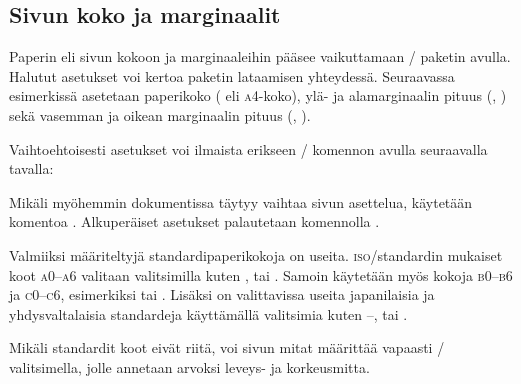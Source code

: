 \subsection{Sivun koko ja marginaalit}
\label{luku/sivun-mitat}

Paperin eli sivun kokoon ja marginaaleihin pääsee vaikuttamaan
\-/ paketin avulla. Halutut asetukset voi kertoa
paketin lataamisen yhteydessä. Seuraavassa esimerkissä asetetaan
paperikoko ( eli \textsc{a4}-koko), ylä- ja
alamarginaalin pituus (, ) sekä vasemman ja
oikean marginaalin pituus (, ).

\begin{koodilohkosis}
\usepackage[a4paper, top=20mm, bottom=30mm,
  left=20mm, right=20mm]{geometry}
\end{koodilohkosis}

\noindent
Vaihtoehtoisesti asetukset voi ilmaista erikseen \-/
komennon avulla seuraavalla tavalla:

\begin{koodilohkosis}
\usepackage{geometry}
\geometry{a4paper, top=20mm, bottom=30mm, left=20mm, right=20mm}
\end{koodilohkosis}

\noindent
Mikäli myöhemmin dokumentissa täytyy vaihtaa sivun asettelua, käytetään
komentoa . Alkuperäiset asetukset palautetaan
komennolla .

\begin{koodilohkosis}
\restoregeometry     %
\end{koodilohkosis}

\noindent
Valmiiksi määriteltyjä standardipaperikokoja on useita.
\textsc{iso}\-/standardin mukaiset koot \textsc{a0}--\textsc{a6}
valitaan valitsimilla kuten ,  tai
. Samoin käytetään myös kokoja \textsc{b0}--\textsc{b6}
ja \textsc{c0}--\textsc{c6}, esimerkiksi  tai
. Lisäksi on valittavissa useita japanilaisia ja
yhdysvaltalaisia standardeja käyttämällä valitsimia kuten
--,  tai
.

Mikäli standardit koot eivät riitä, voi sivun mitat määrittää vapaasti
\-/ valitsimella, jolle annetaan arvoksi leveys- ja
korkeusmitta.

